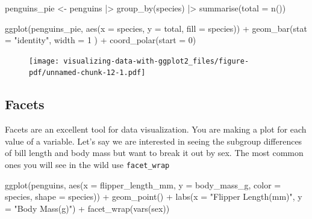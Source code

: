\documentclass[
  letterpaper,
  DIV=11,
  numbers=noendperiod,
  oneside]{scrreprt}
\newenvironment{Shaded}{\begin{snugshade}}{\end{snugshade}}
\newcommand{\AttributeTok}[1]{\textcolor[rgb]{0.40,0.45,0.13}{#1}}
\newcommand{\DecValTok}[1]{\textcolor[rgb]{0.68,0.00,0.00}{#1}}
\newcommand{\FunctionTok}[1]{\textcolor[rgb]{0.28,0.35,0.67}{#1}}
\newcommand{\NormalTok}[1]{\textcolor[rgb]{0.00,0.23,0.31}{#1}}
\newcommand{\OtherTok}[1]{\textcolor[rgb]{0.00,0.23,0.31}{#1}}
\newcommand{\SpecialCharTok}[1]{\textcolor[rgb]{0.37,0.37,0.37}{#1}}
\newcommand{\StringTok}[1]{\textcolor[rgb]{0.13,0.47,0.30}{#1}}
\begin{document}
\begin{Shaded}
\begin{Highlighting}[]
\NormalTok{penguins\_pie }\OtherTok{\textless{}{-}}\NormalTok{ penguins }\SpecialCharTok{|\textgreater{}}
\FunctionTok{group\_by}\NormalTok{(species) }\SpecialCharTok{|\textgreater{}}
\FunctionTok{summarise}\NormalTok{(}\AttributeTok{total =} \FunctionTok{n}\NormalTok{())}

\FunctionTok{ggplot}\NormalTok{(penguins\_pie,}
 \FunctionTok{aes}\NormalTok{(}\AttributeTok{x =}\NormalTok{ species,}
     \AttributeTok{y =}\NormalTok{ total,}
 \AttributeTok{fill =}\NormalTok{ species)) }\SpecialCharTok{+}
\FunctionTok{geom\_bar}\NormalTok{(}\AttributeTok{stat =} \StringTok{"identity"}\NormalTok{, }\AttributeTok{width =} \DecValTok{1}\NormalTok{ ) }\SpecialCharTok{+} 
\FunctionTok{coord\_polar}\NormalTok{(}\AttributeTok{start =} \DecValTok{0}\NormalTok{) }
\end{Highlighting}
\end{Shaded}

\begin{figure}[H]

{\centering \texttt{[image: visualizing-data-with-ggplot2\_files/figure-pdf/unnamed-chunk-12-1.pdf]}

}

\end{figure}

\hypertarget{facets}{%
\subsection{Facets}\label{facets}}

Facets are an excellent tool for data visualization. You are making a
plot for each value of a variable. Let's say we are interested in seeing
the subgroup differences of bill length and body mass but want to break
it out by sex. The most common ones you will see in the wild use
\texttt{facet\_wrap}

\begin{Shaded}
\begin{Highlighting}[]
\FunctionTok{ggplot}\NormalTok{(penguins,}
       \FunctionTok{aes}\NormalTok{(}\AttributeTok{x =}\NormalTok{ flipper\_length\_mm,}
           \AttributeTok{y =}\NormalTok{ body\_mass\_g,}
           \AttributeTok{color =}\NormalTok{ species,}
           \AttributeTok{shape =}\NormalTok{ species)) }\SpecialCharTok{+}
\FunctionTok{geom\_point}\NormalTok{() }\SpecialCharTok{+}
\FunctionTok{labs}\NormalTok{(}\AttributeTok{x =} \StringTok{"Flipper Length(mm)"}\NormalTok{, }\AttributeTok{y =} \StringTok{"Body Mass(g)"}\NormalTok{) }\SpecialCharTok{+}
\FunctionTok{facet\_wrap}\NormalTok{(}\FunctionTok{vars}\NormalTok{(sex))}
\end{Highlighting}
\end{Shaded}
\end{document}

